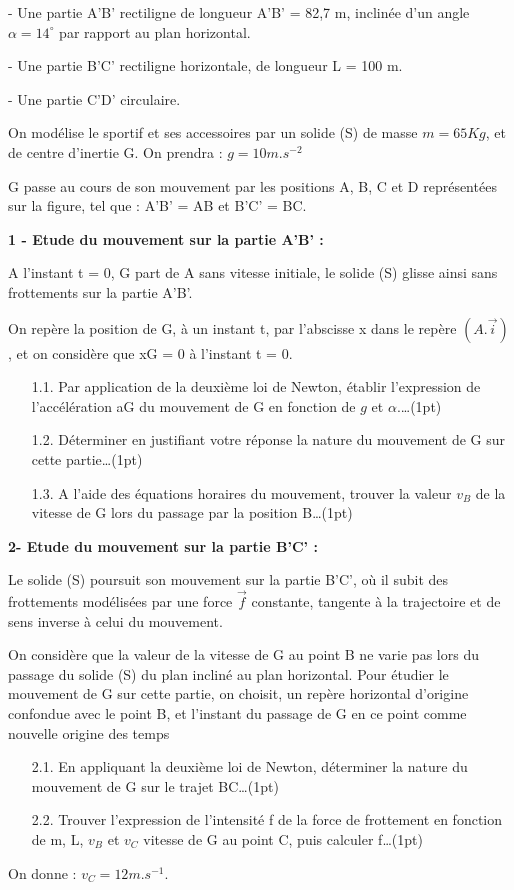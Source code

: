 \documentclass[12pt]{article}
\begin{document}
- Une partie A’B’ rectiligne de longueur A’B’ = 82,7 m, inclinée d’un angle $\alpha = 14^{\circ}$
par rapport au plan horizontal.

- Une partie B’C’ rectiligne horizontale, de longueur L = 100 m.

- Une partie C’D’ circulaire.

On modélise le sportif et ses accessoires par un solide (S) de masse $m = 65 Kg$, et de
centre d’inertie G. On prendra : $g = 10 m.s^{-2}$

G passe au cours de son mouvement par les positions A, B, C et D représentées sur la
figure, tel que : A’B’ = AB et B’C’ = BC.

\textbf{1 - Etude du mouvement sur la partie A’B’ :}

A l’instant t = 0, G part de A sans vitesse initiale, le solide (S) glisse ainsi sans
frottements sur la partie A’B’.

On repère la position de G, à un instant t, par l’abscisse x dans le repère $(A.\vec{i})$ , et on considère que xG = 0 à l’instant t = 0.


\begin{enumerate}
  \item[1.1.] Par application de la deuxième loi de Newton, établir l’expression de
l’accélération aG du mouvement de G en fonction de $g$ et $\alpha$.\dots(1pt)
\item[1.2.] Déterminer en justifiant votre réponse la nature du mouvement de G sur
  cette partie\dots(1pt)
\item[1.3.] A l’aide des équations horaires du mouvement, trouver la valeur $v_B$ de la
vitesse de G lors du passage par la position B\dots(1pt)
  \end{enumerate}

  \textbf{2- Etude du mouvement sur la partie B’C’ :}
  
  Le solide (S) poursuit son mouvement sur la partie B’C’, où il subit des frottements
modélisées par une force $\vec{f}$ constante, tangente à la trajectoire et de sens inverse à
celui du mouvement.

On considère que la valeur de la vitesse de G au point B ne varie pas lors du passage
du solide (S) du plan incliné au plan horizontal.
Pour étudier le mouvement de G sur cette partie, on choisit, un repère horizontal
d’origine confondue avec le point B, et l’instant du passage de G en ce point comme
nouvelle origine des temps

\begin{enumerate}
  \item[2.1.] En appliquant la deuxième loi de Newton, déterminer la nature du
    mouvement de G sur le trajet BC\dots(1pt)
\item[2.2.] Trouver l’expression de l’intensité f de la force de frottement en fonction
  de m, L, $v_B$ et $v_C$ vitesse de G au point C, puis calculer f\dots(1pt)
  \end{enumerate}
On donne : $v_C = 12 m.s^{-1}$.
\end{document}
